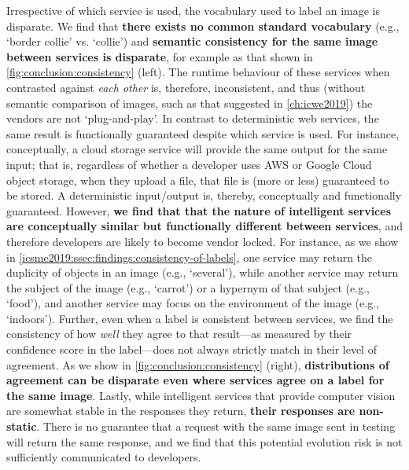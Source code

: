 Irrespective of which service is used, the vocabulary used to label an image is disparate. We find that \textbf{there exists no common standard vocabulary} (e.g., `border collie' vs. `collie') and \textbf{semantic consistency for the same image between services is disparate}, for example as that shown in \cref{fig:conclusion:consistency} (left). The runtime behaviour of these services when contrasted against \textit{each other} is, therefore, inconsistent, and thus (without semantic comparison of images, such as that suggested in \cref{ch:icwe2019}) the vendors are not `plug-and-play'. In contrast to deterministic web services, the same result is functionally guaranteed despite which service is used. For instance, conceptually, a cloud storage service will provide the same output for the same input; that is, regardless of whether a developer uses AWS or Google Cloud object storage, when they upload a file, that file is (more or less) guaranteed to be stored. A deterministic input/output is, thereby, conceptually and functionally guaranteed. However, \textbf{we find that that the nature of intelligent services are conceptually similar but functionally different between services}, and therefore developers are likely to become vendor locked. For instance, as we show in \cref{icsme2019:ssec:findings:consistency-of-labels}, one service may return the duplicity of objects in an image (e.g., `several'), while another service may return the subject of the image (e.g., `carrot') or a hypernym of that subject (e.g., `food'), and another service may focus on the environment of the image (e.g., `indoors').
Further, even when a label is consistent between services, we find the consistency of how \textit{well} they agree to that result---as measured by their confidence score in the label---does not always strictly match in their level of agreement. As we show in \cref{fig:conclusion:consistency} (right), \textbf{distributions of agreement can be disparate even where services agree on a label for the same image}.
Lastly, while intelligent services that provide computer vision are somewhat stable in the responses they return, \textbf{their responses are non-static}. There is no guarantee that a request with the same image sent in testing will return the same response, and we find that this potential evolution risk is not sufficiently communicated to developers.

